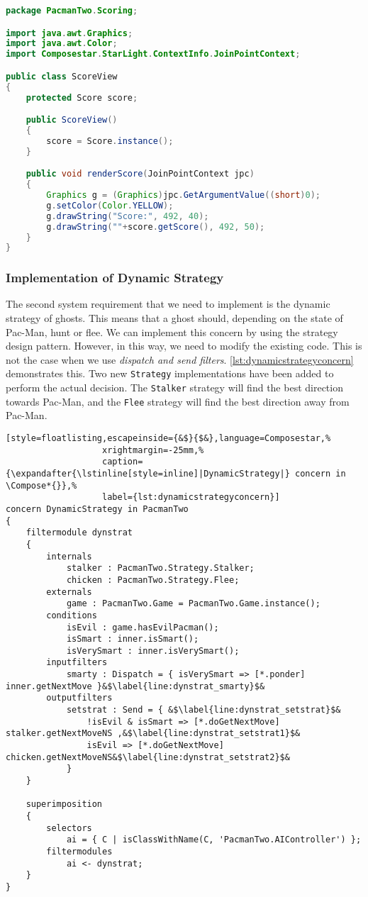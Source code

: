 \begin{lstlisting}[style=floatlisting,language=Java,%
                   caption={Implementation of class \expandafter{\lstinline[style=inline]|ScoreView|}},%
                   label={lst:scoreview_impl}]
package PacmanTwo.Scoring;

import java.awt.Graphics;
import java.awt.Color;
import Composestar.StarLight.ContextInfo.JoinPointContext;

public class ScoreView
{
	protected Score score;

	public ScoreView()
	{
		score = Score.instance();
	}

	public void renderScore(JoinPointContext jpc)
	{
		Graphics g = (Graphics)jpc.GetArgumentValue((short)0);
		g.setColor(Color.YELLOW);
		g.drawString("Score:", 492, 40);
		g.drawString(""+score.getScore(), 492, 50);
	}
}
\end{lstlisting}

\subsubsection{Implementation of Dynamic Strategy}

The second system requirement that we need to implement is the dynamic strategy of ghosts.
This means that a ghost should, depending on the state of Pac-Man, hunt or flee.
We can implement this concern by using the strategy design pattern.
However, in this way, we need to modify the existing code.
This is not the case when we use \Compose*{} \emph{dispatch and send filters}.
\autoref{lst:dynamicstrategyconcern} demonstrates this. 
Two new \lstinline|Strategy| implementations have been added to perform the actual decision. The \lstinline|Stalker| strategy will find the best direction towards Pac-Man, and the \lstinline|Flee| strategy will find the best direction away from Pac-Man.

\begin{lstlisting}[style=floatlisting,escapeinside={&$}{$&},language=Composestar,%
                   xrightmargin=-25mm,%
                   caption={\expandafter{\lstinline[style=inline]|DynamicStrategy|} concern in \Compose*{}},%
                   label={lst:dynamicstrategyconcern}]
concern DynamicStrategy in PacmanTwo
{
	filtermodule dynstrat
	{
		internals
			stalker : PacmanTwo.Strategy.Stalker;
			chicken : PacmanTwo.Strategy.Flee;
		externals
			game : PacmanTwo.Game = PacmanTwo.Game.instance();
		conditions
			isEvil : game.hasEvilPacman();
			isSmart : inner.isSmart();
			isVerySmart : inner.isVerySmart();
		inputfilters
			smarty : Dispatch = { isVerySmart => [*.ponder] inner.getNextMove }&$\label{line:dynstrat_smarty}$&
		outputfilters
			setstrat : Send = { &$\label{line:dynstrat_setstrat}$&
				!isEvil & isSmart => [*.doGetNextMove] stalker.getNextMoveNS ,&$\label{line:dynstrat_setstrat1}$&
				isEvil => [*.doGetNextMove] chicken.getNextMoveNS&$\label{line:dynstrat_setstrat2}$&
			}
	}

	superimposition
	{
		selectors
			ai = { C | isClassWithName(C, 'PacmanTwo.AIController') };
		filtermodules
			ai <- dynstrat;
	}
}
\end{lstlisting}

